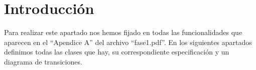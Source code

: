 \section{Introducción}
Para realizar este apartado nos hemos fijado en todas las funcionalidades que aparecen en el ``Apendice A''
del archivo ``fase1.pdf''. En los siguientes apartados definimos todas las clases que hay, su correspondiente especificación 
y un diagrama de transiciones.